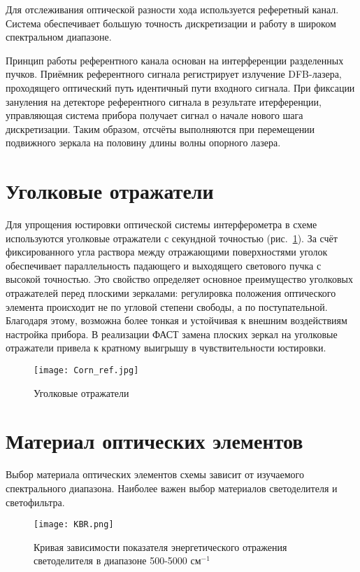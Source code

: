 \documentclass{mipt-thesis-bs}
\begin{document}
	Для отслеживания оптической разности хода используется реферетный канал. Система обеспечивает большую точность дискретизации и работу в широком спектральном диапазоне. 
	
	Принцип работы референтного канала основан на интерференции разделенных пучков. Приёмник референтного сигнала регистрирует излучение DFB-лазера, проходящего оптический путь идентичный пути входного сигнала. При фиксации зануления на детекторе референтного сигнала в результате итерференции, управляющая система прибора получает сигнал о начале нового шага дискретизации. Таким образом, отсчёты выполняются при перемещении подвижного зеркала на половину длины волны опорного лазера.   
	
	\section{Уголковые отражатели}
	
	Для упрощения юстировки оптической системы интерферометра в схеме используются уголковые отражатели с секундной точностью (рис.~\ref{fig_reflectors}). За счёт фиксированного угла раствора между отражающими поверхностями уголок обеспечивает параллельность падающего и выходящего светового пучка с высокой точностью. Это свойство определяет основное преимущество уголковых отражателей перед плоскими зеркалами: регулировка положения оптического элемента происходит не по угловой степени свободы, а по поступательной. Благодаря этому, возможна более тонкая и устойчивая к внешним воздействиям настройка прибора. В реализации ФАСТ замена плоских зеркал на уголковые отражатели привела к кратному выигрышу в чувствительности юстировки.
	
	\begin{figure}[h!]
		\centering
		\texttt{[image: Corn\_ref.jpg]}
		\caption{Уголковые отражатели}
		\label{fig_reflectors}
	\end{figure}
	
	\section{Материал оптических элементов}
	
 Выбор материала оптических элементов схемы зависит от изучаемого спектрального диапазона. Наиболее важен выбор материалов светоделителя и светофильтра.
	
	\begin{figure}[h]
		\centering
		\texttt{[image: KBR.png]}
		\caption{Кривая зависимости показателя энергетического отражения светоделителя в диапазоне 500-5000 $см^{-1}$}
		\label{fig_lightcurve}
	\end{figure}
	
\end{document}
